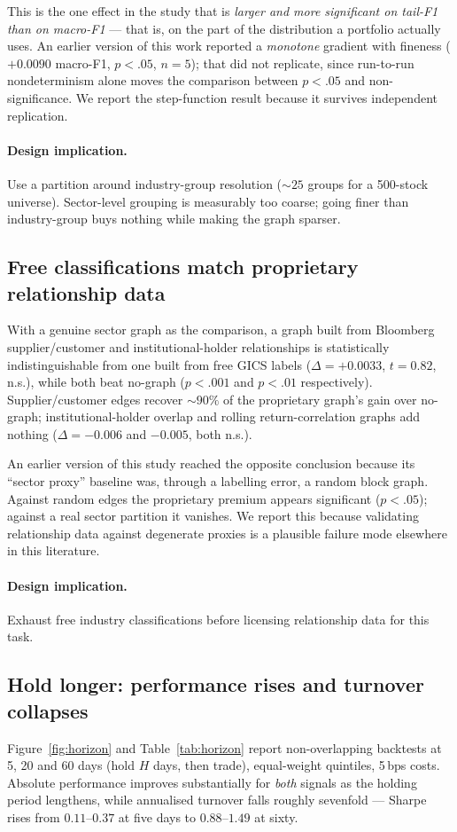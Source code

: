 This is the one effect in the study that is \emph{larger and more
significant on tail-F1 than on macro-F1} --- that is, on the part of the
distribution a portfolio actually uses. An earlier version of this work
reported a \emph{monotone} gradient with fineness ($+0.0090$ macro-F1,
$p<.05$, $n=5$); that did not replicate, since run-to-run nondeterminism
alone moves the comparison between $p<.05$ and non-significance. We report
the step-function result because it survives independent replication.

\paragraph{Design implication.} Use a partition around industry-group
resolution (${\sim}25$ groups for a 500-stock universe). Sector-level
grouping is measurably too coarse; going finer than industry-group buys
nothing while making the graph sparser.

\subsection{Free classifications match proprietary relationship data}
With a genuine sector graph as the comparison, a graph built from Bloomberg
supplier/customer and institutional-holder relationships is statistically
indistinguishable from one built from free GICS labels
($\Delta = +0.0033$, $t=0.82$, n.s.), while both beat no-graph ($p<.001$ and
$p<.01$ respectively). Supplier/customer edges recover ${\sim}90\%$ of the
proprietary graph's gain over no-graph; institutional-holder overlap and
rolling return-correlation graphs add nothing ($\Delta = -0.006$ and
$-0.005$, both n.s.).

An earlier version of this study reached the opposite conclusion because its
``sector proxy'' baseline was, through a labelling error, a random block
graph. Against random edges the proprietary premium appears significant
($p<.05$); against a real sector partition it vanishes. We report this
because validating relationship data against degenerate proxies is a
plausible failure mode elsewhere in this literature.

\paragraph{Design implication.} Exhaust free industry classifications before
licensing relationship data for this task.

\subsection{Hold longer: performance rises and turnover collapses}
Figure~\ref{fig:horizon} and Table~\ref{tab:horizon} report non-overlapping backtests at 5, 20 and 60
days (hold $H$ days, then trade), equal-weight quintiles, 5\,bps costs.
Absolute performance improves substantially for \emph{both} signals as the
holding period lengthens, while annualised turnover falls roughly
sevenfold --- Sharpe rises from $0.11$--$0.37$ at five days to
$0.88$--$1.49$ at sixty.

